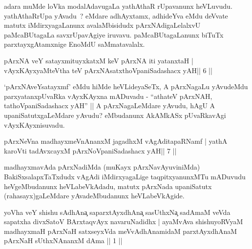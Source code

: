\begin{artha}
adara muMde loVka modalAdavugaLa yathAthaR rUpavanunx heVLuvudu. yathAthaRrUpa yAvadu~? eMdare adhAyxtamx, adhideYva eMdu deVvate matutx iMdirxyagaLanunx avalaMbisidudx pArxNAdigaLelalxvU paMcaBUtagaLa savxrUpavAgiye iruvavu. paMcaBUtagaLanunx biTuTx parxtayxgAtamxnige EnoMdU saMmatavalalx.
\end{artha}

\begin{shl}
pArxNA veY satayxmituyxkatxM keV pArxNA iti yatanxtaH |
vAyxKAyxyaMteV\s tha teV pArxNAsatxthoVpaniSadashacx yAH\hfill || 6 ||
\end{shl}

\begin{artha}
`pArxNAveYsatayxmf' eMdu hiMde heVLideyaSeTx, A pArxNagaLu yAvudeMdu   parxyatanxpUvaRka vAyxKAyxna mADuvadu - ``athateV pArxNAH,   tathoVpaniSadashacx yAH'' || A pArxNagaLeMdare yAvudu, hAgU A   upaniSatutxgaLeMdare yAvudu? eMbudanunx AkAMkASx pUvaRkavAgi   vAyxKAyxnisuvadu.
\end{artha}



\begin{shl}
pArxNeVna madhayxmeVnAnanxM jagadhxM vAgAditapaRNamf |
yathA karoVti tadAvxcayxM pArxNoVpaniSadashacx yAH\hfill || 7 ||
\end{shl}

\begin{artha}
madhayxmavAda pArxNadiMda (muKayx pArxNavAyuviniMda) BakiSxsalapxTaTxdudx vAgAdi iMdirxyagaLige taqpitxyanunxMTu mADuvudu heVgeMbudanunx heVLabeVkAdadu, matutx pArxNada upaniSatutx (rahasayx)gaLeMdare yAvadeMbudanunx heVLabeVkAgide.
\end{artha}

\newpage
\begin{kandikeshl}
yoVha veY shishu sAdhAna{\c} saparxtAyxdhAna{\c} sasUthxNa{\c} sadAmaM veVda
sapatxha divxSatoV BArxtaqvAyx navaruNadidhx | ayaMvAva shishuyoRVyaM
madhayxmaH pArxNaH satxseyxVda meVvAdhAnamidaM parxtAyxdhAnaM pArxNaH
sUthxNAnanxM dAma || 1 ||
\end{kandikeshl}


